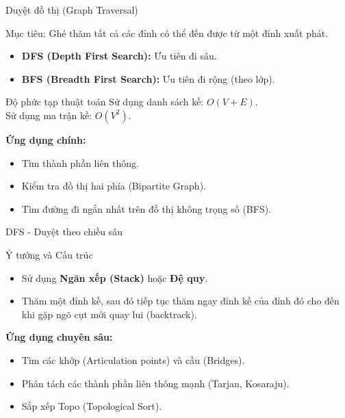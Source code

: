 \documentclass{beamer}
\begin{document}
\begin{frame}{Duyệt đồ thị (Graph Traversal)}

Mục tiêu: Ghé thăm tất cả các đỉnh có thể đến được từ một đỉnh xuất phát.

\begin{itemize}
\item \textbf{DFS (Depth First Search):} Ưu tiên đi sâu.
\item \textbf{BFS (Breadth First Search):} Ưu tiên đi rộng (theo lớp).
\end{itemize}

\pause

\begin{alertblock}{Độ phức tạp thuật toán}
Sử dụng danh sách kề: $O(V + E)$.\\
Sử dụng ma trận kề: $O(V^2)$.
\end{alertblock}

\pause
\textbf{Ứng dụng chính:}
\begin{itemize}
\item Tìm thành phần liên thông.
\item Kiểm tra đồ thị hai phía (Bipartite Graph).
\item Tìm đường đi ngắn nhất trên đồ thị không trọng số (BFS).
\end{itemize}

\end{frame}


\begin{frame}{DFS - Duyệt theo chiều sâu}

\begin{block}{Ý tưởng và Cấu trúc}
\begin{itemize}
\item Sử dụng \textbf{Ngăn xếp (Stack)} hoặc \textbf{Đệ quy}.
\item Thăm một đỉnh kề, sau đó tiếp tục thăm ngay đỉnh kề của đỉnh đó cho đến khi gặp ngõ cụt mới quay lui (backtrack).
\end{itemize}
\end{block}

\pause
\textbf{Ứng dụng chuyên sâu:}
\begin{itemize}
\item Tìm các khớp (Articulation points) và cầu (Bridges).
\item Phân tách các thành phần liên thông mạnh (Tarjan, Kosaraju).
\item Sắp xếp Topo (Topological Sort).
\end{itemize}

\end{frame}
\end{document}
